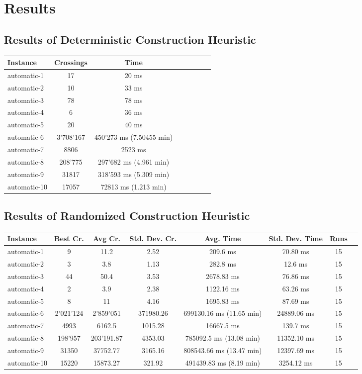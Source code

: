 \documentclass[11pt]{article}
\begin{document}
\section{Results}
\subsection{Results of Deterministic Construction Heuristic}
{
\begin{tabular}{l*{6}{c}r}
	Instance & Crossings & Time \\
	\hline
	automatic-1 & 17 & 20 ms \\
	automatic-2 & 10 & 33 ms \\
	automatic-3 & 78 & 78 ms \\
	automatic-4 & 6 & 36 ms \\
	automatic-5 & 20 & 40 ms \\
	automatic-6 & 3'708'167 & 450'273 ms (7.50455 min) \\
	automatic-7 & 8806 & 2523 ms \\
	automatic-8 & 208'775 & 297'682 ms  (4.961 min) \\
	automatic-9 & 31817 & 318'593 ms (5.309 min) \\
	automatic-10 & 17057 & 72813 ms (1.213 min) \\
\end{tabular}
}


\subsection{Results of Randomized Construction Heuristic}
{
\begin{tabular}{l*{6}{c}r}
	Instance & Best Cr. & Avg Cr. & Std. Dev. Cr. & Avg. Time & Std. Dev. Time & Runs \\
	\hline
	automatic-1 & 9 & 11.2 & 2.52 & 209.6 ms & 70.80 ms & 15 \\
	automatic-2 & 3 & 3.8 & 1.13 & 282.8 ms & 12.6 ms & 15 \\
	automatic-3 & 44 & 50.4 & 3.53 & 2678.83 ms & 76.86 ms & 15 \\
	automatic-4 & 2 & 3.9 & 2.38 & 1122.16 ms & 63.26 ms & 15 \\
	automatic-5 & 8 & 11 & 4.16 & 1695.83 ms & 87.69 ms & 15 \\
	automatic-6 & 2'021'124 & 2'859'051 & 371980.26 & 699130.16 ms (11.65 min) & 24889.06 ms & 15 \\
	automatic-7 & 4993 & 6162.5 & 1015.28 & 16667.5 ms & 139.7 ms & 15 \\
	automatic-8 & 198'957 & 203'191.87 & 4353.03 & 785092.5 ms (13.08 min) & 11352.10 ms & 15 \\
	automatic-9 & 31350 & 37752.77 & 3165.16 & 808543.66 ms (13.47 min) & 12397.69 ms & 15 \\
	automatic-10 & 15220 & 15873.27 & 321.92 & 491439.83 ms (8.19 min) & 3254.12 ms & 15 \\
\end{tabular}
}
\end{document}
